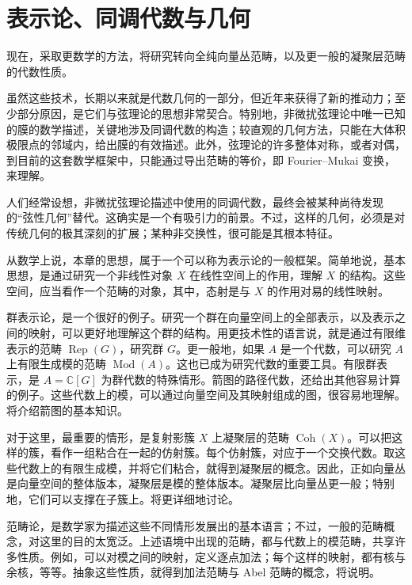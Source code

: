 \chapter{表示论、同调代数与几何}\label{chap:4}

现在，采取更数学的方法，将研究转向全纯向量丛范畴，以及更一般的凝聚层范畴的代数性质。

虽然这些技术，长期以来就是代数几何的一部分，但近年来获得了新的推动力；至少部分原因，是它们与弦理论的思想非常契合。特别地，非微扰弦理论中唯一已知的膜的数学描述，关键地涉及同调代数的构造；较直观的几何方法，只能在大体积极限点的邻域内，给出膜的有效描述。此外，弦理论的许多整体对称，或者对偶，到目前的这套数学框架中，只能通过导出范畴的等价，即 Fourier--Mukai 变换，来理解。

人们经常设想，非微扰弦理论描述中使用的同调代数，最终会被某种尚待发现的“弦性几何”替代。这确实是一个有吸引力的前景。不过，这样的几何，必须是对传统几何的极其深刻的扩展；某种非交换性，很可能是其根本特征。

从数学上说，本章的思想，属于一个可以称为表示论的一般框架。简单地说，基本思想，是通过研究一个非线性对象 $X$ 在线性空间上的作用，理解 $X$ 的结构。这些空间，应当看作一个范畴的对象，其中，态射是与 $X$ 的作用对易的线性映射。

群表示论，是一个很好的例子。研究一个群在向量空间上的全部表示，以及表示之间的映射，可以更好地理解这个群的结构。用更技术性的语言说，就是通过有限维表示的范畴 $\operatorname{Rep}(G)$，研究群 $G$。更一般地，如果 $A$ 是一个代数，可以研究 $A$ 上有限生成模的范畴 $\operatorname{Mod}(A)$。这也已成为研究代数的重要工具。有限群表示，是 $A=\mathbb{C}[G]$ 为群代数的特殊情形。箭图的路径代数，还给出其他容易计算的例子。这些代数上的模，可以通过向量空间及其映射组成的图，很容易地理解。将介绍箭图的基本知识。

对于这里，最重要的情形，是复射影簇 $X$ 上凝聚层的范畴 $\operatorname{Coh}(X)$。可以把这样的簇，看作一组粘合在一起的仿射簇。每个仿射簇，对应于一个交换代数。取这些代数上的有限生成模，并将它们粘合，就得到凝聚层的概念。因此，正如向量丛是向量空间的整体版本，凝聚层是模的整体版本。凝聚层比向量丛更一般；特别地，它们可以支撑在子簇上。将更详细地讨论。

范畴论，是数学家为描述这些不同情形发展出的基本语言；不过，一般的范畴概念，对这里的目的太宽泛。上述语境中出现的范畴，都与代数上的模范畴，共享许多性质。例如，可以对模之间的映射，定义逐点加法；每个这样的映射，都有核与余核，等等。抽象这些性质，就得到加法范畴与 Abel 范畴的概念，将说明。

